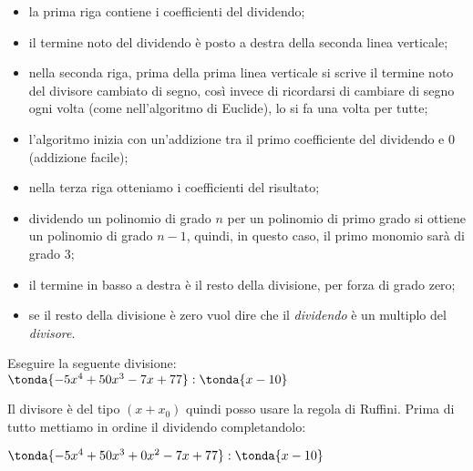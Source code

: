 \begin{osservazioni}{}{}
\begin{itemize} [left=0mm, nosep]
\item la prima riga contiene i coefficienti del dividendo;
\item il termine noto del dividendo è posto a destra della seconda 
linea verticale;
\item nella seconda riga, prima della prima linea verticale si scrive 
il   termine noto del divisore cambiato di segno, così invece di 
ricordarsi di cambiare di segno ogni volta 
(come nell'algoritmo di Euclide), lo si fa una volta per tutte;
\item l'algoritmo inizia con un'addizione tra il primo coefficiente del 
dividendo e \(0\) (addizione facile);
\item nella terza riga otteniamo i coefficienti del risultato;
\item dividendo un polinomio di grado \(n\) per un polinomio di primo 
grado   si ottiene un polinomio di grado \(n-1\), quindi, in questo 
caso, il primo monomio sarà di grado \(3\);
\item il termine in basso a destra è il resto della divisione, 
per forza di   grado zero;
\item se il resto della divisione è zero vuol dire che il 
\emph{dividendo} è un multiplo del \emph{divisore}.
\end{itemize}
\end{osservazioni}

%
\begin{esempio}{}{}
Eseguire la seguente divisione: \\ 
\(\tonda{-5x^4 +50x^3 -7x +77  } : \tonda{x -10}\)

Il divisore è del tipo \((x + x_0)\) quindi posso usare la regola di Ruffini.
Prima di tutto mettiamo in ordine il dividendo completandolo:

\(\tonda{-5x^4 +50x^3 +0x^2 -7x +77  } : \tonda{x -10}\)

\end{esempio}

